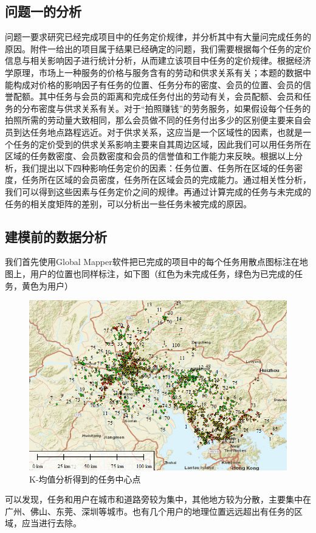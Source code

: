 \documentclass[withoutpreface,bwprint]{cumcmthesis} %
\begin{document}
\subsection{问题一的分析}
问题一要求研究已经完成项目中的任务定价规律，并分析其中有大量问完成任务的原因。附件一给出的项目属于结果已经确定的问题，我们需要根据每个任务的定价信息与相关影响因子进行统计分析，从而建立该项目中任务的定价规律。根据经济学原理，市场上一种服务的价格与服务含有的劳动和供求关系有关；本题的数据中能构成对价格的影响因子有任务的位置、任务分布的密度、会员的位置、会员的信誉配额。其中任务与会员的距离和完成任务付出的劳动有关，会员配额、会员和任务的分布密度与供求关系有关。对于“拍照赚钱”的劳务服务，如果假设每个任务的拍照所需的劳动量大致相同，那么会员做不同的任务付出多少的区别便主要来自会员到达任务地点路程远近。对于供求关系，这应当是一个区域性的因素，也就是一个任务的定价受到的供求关系影响主要来自其周边区域，因此我们可以用任务所在区域的任务数密度、会员数密度和会员的信誉值和工作能力来反映。根据以上分析，我们提出以下四种影响任务定价的因素：任务位置、任务所在区域的任务密度，任务所在区域的会员密度，任务所在区域会员的完成能力。通过相关性分析，我们可以得到这些因素与任务定价之间的规律。再通过计算完成的任务与未完成的任务的相关度矩阵的差别，可以分析出一些任务未被完成的原因。

\subsection{建模前的数据分析}
我们首先使用Global Mapper软件把已完成的项目中的每个任务用散点图标注在地图上，用户的位置也同样标注，如下图（红色为未完成任务，绿色为已完成的任务，黄色为用户）

\begin{figure}[H]
    \centering
    \includegraphics[width=15cm]{1.png} 
    \caption{K-均值分析得到的任务中心点} 
    \label{图} 
\end{figure}
可以发现，任务和用户在城市和道路旁较为集中，其他地方较为分散，主要集中在广州、佛山、东莞、深圳等城市。也有几个用户的地理位置远远超出有任务的区域，应当进行去除。
\end{document}
